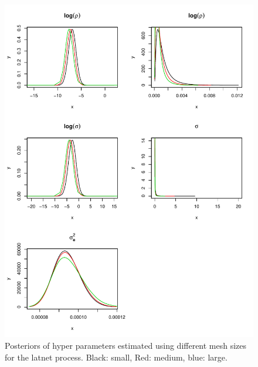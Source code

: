 \documentclass[a4paper,12pt]{article}
\begin{document}
\begin{figure}[htbp]
 \begin{center}
 \includegraphics{fig/MeshSize_1hyperpar.pdf}
 \end{center}
 \caption[Hyper parameter for different mesh sizes]{Posteriors of hyper parameters estimated using different mesh sizes for the latnet process. Black: small, Red: medium, blue: large.}
 \label{fig:2}
 \end{figure}
\end{document}
